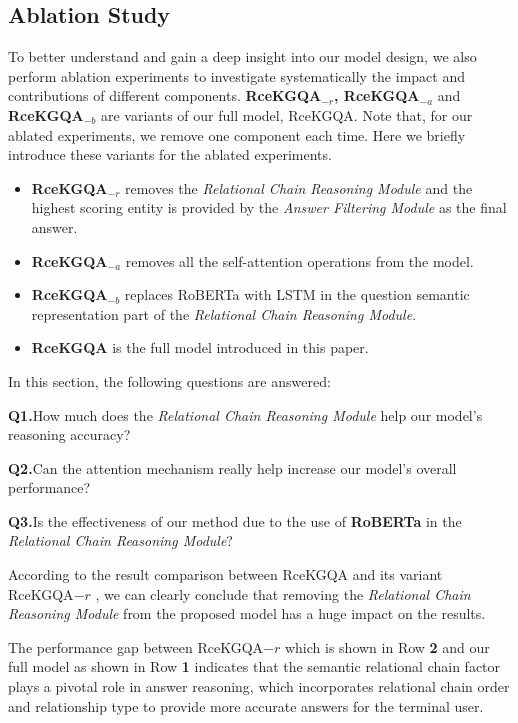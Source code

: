\documentclass[pdflatex,sn-mathphys]{sn-jnl}%
\theoremstyle{thmstyleone}%
\theoremstyle{thmstyletwo}%
\theoremstyle{thmstylethree}%
\begin{document}
\subsection{Ablation Study}
To better understand and gain a deep insight into our model design, we also perform ablation experiments to investigate systematically the impact and contributions of different components.  \textbf{RceKGQA$_{-r}$, RceKGQA$_{-a}$} and \textbf{ RceKGQA$_{-b}$} are variants of our full model, RceKGQA. Note that, for our ablated experiments, we remove one component each time. Here we briefly introduce these variants for the ablated experiments.
\begin{itemize}
\item \textbf{RceKGQA$_{-r}$} removes the \textit{Relational Chain Reasoning Module} and the highest scoring entity is provided by the \textit{Answer Filtering Module} as the final answer. 
\item \textbf{RceKGQA$_{-a}$} removes all the self-attention operations from the model. 
\item \textbf{RceKGQA$_{-b}$} replaces RoBERTa with LSTM in the question semantic representation part of the \textit{Relational Chain Reasoning Module}.
\item \textbf{RceKGQA} is the full model introduced in this paper.
\end{itemize}


In this section, the following questions are answered:

\textbf{Q1.}\quad How much does the \textit{Relational Chain Reasoning Module} help our model's reasoning accuracy?

\textbf{Q2.}\quad Can the attention mechanism really help increase our model's overall performance?

\textbf{Q3.}\quad Is the effectiveness of our method due to the use of \textbf{RoBERTa} in the \textit{Relational Chain Reasoning Module}?

According to the result comparison between RceKGQA and its variant RceKGQA${-r}$
, we can clearly conclude that removing the \textit{Relational Chain Reasoning Module} from the proposed model has a huge impact on the results. 

The performance gap between RceKGQA${-r}$ which is shown in Row \textbf{2} and our full model as shown in Row \textbf{1} indicates that the semantic relational chain factor plays a pivotal role in answer reasoning, which incorporates relational chain order and relationship type to provide more accurate answers for the terminal user.
\end{document}
